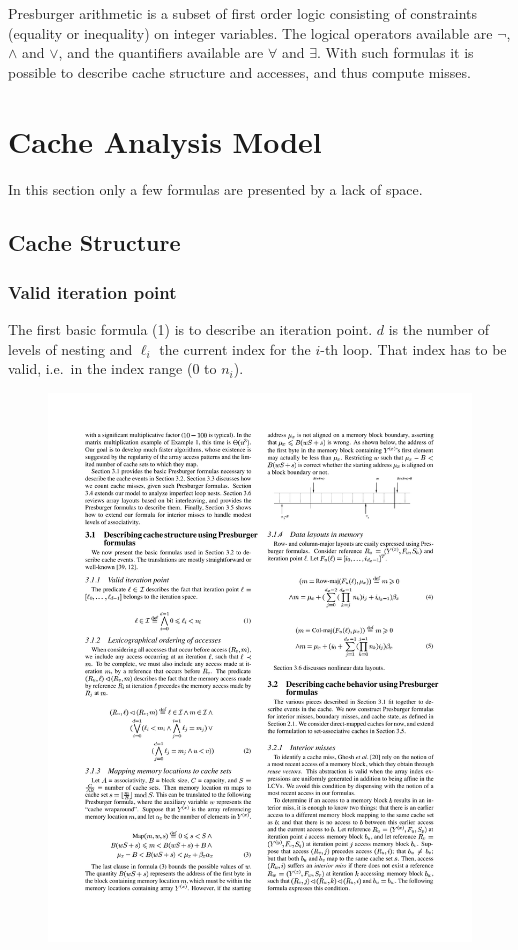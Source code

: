 \documentclass{article}
\begin{document}
Presburger arithmetic is a subset of first order logic consisting of constraints (equality or inequality) on integer variables.
The logical operators available are $\neg$, $\wedge$ and $\vee$, and the quantifiers available are $\forall$ and $\exists$.
With such formulas it is possible to describe cache structure and accesses, and thus compute misses.


\section{Cache Analysis Model}
\label{model}
In this section only a few formulas are presented by a lack of space.

\subsection{Cache Structure}

\subsubsection{Valid iteration point}
The first basic formula (1) is to describe an iteration point.
$d$ is the number of levels of nesting and $\ell_i$ the current index for the $i$-th loop.
That index has to be valid, i.e.\ in the index range ($0$ to $n_i$).
\begin{figure}[H]
        \centering
        \includegraphics[scale=1.1]{eq1}
\label{fig:eq1}
\end{figure}
\end{document}
